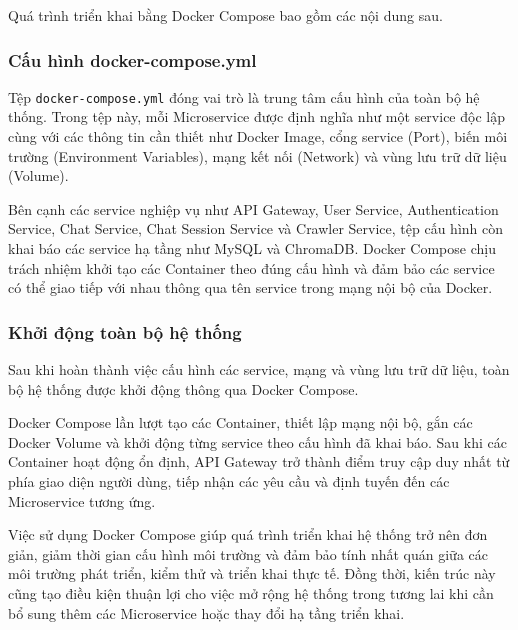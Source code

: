 \documentclass[../DoAn.tex]{subfiles}
\begin{document}
Quá trình triển khai bằng Docker Compose bao gồm các nội dung sau.

\subsubsection{Cấu hình docker-compose.yml}

Tệp \texttt{docker-compose.yml} đóng vai trò là trung tâm cấu hình của toàn bộ hệ thống. Trong tệp này, mỗi Microservice được định nghĩa như một service độc lập cùng với các thông tin cần thiết như Docker Image, cổng service (Port), biến môi trường (Environment Variables), mạng kết nối (Network) và vùng lưu trữ dữ liệu (Volume).

Bên cạnh các service nghiệp vụ như API Gateway, User Service, Authentication Service, Chat Service, Chat Session Service và Crawler Service, tệp cấu hình còn khai báo các service hạ tầng như MySQL và ChromaDB. Docker Compose chịu trách nhiệm khởi tạo các Container theo đúng cấu hình và đảm bảo các service có thể giao tiếp với nhau thông qua tên service trong mạng nội bộ của Docker.

\subsubsection{Khởi động toàn bộ hệ thống}
Sau khi hoàn thành việc cấu hình các service, mạng và vùng lưu trữ dữ liệu, toàn bộ hệ thống được khởi động thông qua Docker Compose.

Docker Compose lần lượt tạo các Container, thiết lập mạng nội bộ, gắn các Docker Volume và khởi động từng service theo cấu hình đã khai báo. Sau khi các Container hoạt động ổn định, API Gateway trở thành điểm truy cập duy nhất từ phía giao diện người dùng, tiếp nhận các yêu cầu và định tuyến đến các Microservice tương ứng.

Việc sử dụng Docker Compose giúp quá trình triển khai hệ thống trở nên đơn giản, giảm thời gian cấu hình môi trường và đảm bảo tính nhất quán giữa các môi trường phát triển, kiểm thử và triển khai thực tế. Đồng thời, kiến trúc này cũng tạo điều kiện thuận lợi cho việc mở rộng hệ thống trong tương lai khi cần bổ sung thêm các Microservice hoặc thay đổi hạ tầng triển khai.
\end{document}
